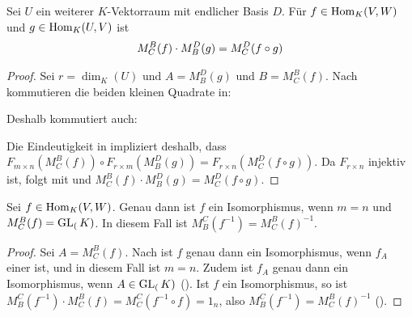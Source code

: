 \begin{lemma}
	Sei $U$ ein weiterer $K$-Vektorraum mit endlicher Basis $D$. Für $f\in \operatorname{Hom}_K(V,W)$ und $g\in \operatorname{Hom}_K(U,V)$ ist 
	\begin{align}
		M_C^B(f)\cdot M_B^D(g)=M_C^D(f\circ g)\notag
	\end{align}
\end{lemma}
\begin{proof}
	Sei $r=\dim_K(U)$ und $A=M_B^D(g)$ und $B=M_C^B(f)$. Nach  kommutieren die beiden kleinen Quadrate in: 
	\begin{center}\end{center}
	Deshalb kommutiert auch:
	\begin{center}\end{center}
	Die Eindeutigkeit in  impliziert deshalb, dass $F_{m\times n}(M_C^B(f))\circ F_{r\times m}(M_B^D(g))=F_{r\times n}
	(M_C^D(f\circ g))$. Da $F_{r\times n}$ injektiv ist, folgt mit  und  $M_C^B(f)\cdot M_B^D(g)=M_C^D(f\circ g)$.
\end{proof}

\begin{conclusion}
	Sei $f\in \operatorname{Hom}_K(V,W)$. Genau dann ist $f$ ein Isomorphismus, wenn $m=n$ und $M_C^B(f)=\operatorname{GL}_(K)$. In 
	diesem Fall ist $M_B^C(f^{-1})=M_C^B(f)^{-1}$.
\end{conclusion}
\begin{proof}
	Sei $A=M_C^B(f)$. Nach  ist $f$ genau dann ein Isomorphismus, wenn $f_A$ einer ist, und in diesem Fall ist $m=n$. Zudem ist 
	$f_A$ genau dann ein Isomorphismus, wenn $A\in \operatorname{GL}_(K)$ (). Ist $f$ ein Isomorphismus, so ist $M_B^C(f^{-1})\cdot 
	M_C^B(f)=M_C^C(f^{-1}\circ f)=1_n$, also $M_B^C(f^{-1})=M_C^B(f)^{-1}$ ().
\end{proof}

